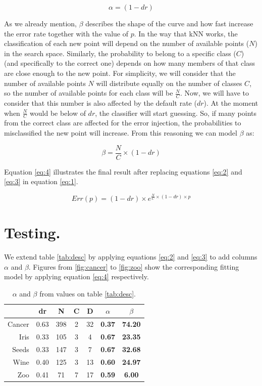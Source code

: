 \documentclass{article}
\begin{document}
\begin{equation}\label{eq:2}
  \alpha = (1-dr)
\end{equation}

As we already mention, $\beta$ describes the shape of the curve and how fast increase the error rate together with the value of $p$. In the way that kNN works, the classification of each new point will depend on the number of available points ($N$) in the search space.  Similarly, the probability to belong to a specific class ($C$) (and specifically to the correct one) depends on how many members of that class are close enough to the new point. For simplicity, we will consider that the number of available points $N$ will distribute equally on the number of classes $C$, so the number of available points for each class will be $\frac{N}{C}$.  Now, we will have to consider that this number is also affected by the default rate ($dr$).  At the moment when $\frac{N}{C}$ would be below of $dr$, the classifier will start guessing. So, if many points from the correct class are affected for the error injection, the probabilities to misclassified the new point will increase.  From this reasoning we can model $\beta$ as: 

\begin{equation}\label{eq:3}
  \beta = \frac{N}{C} \times (1-dr)
\end{equation}

Equation \ref{eq:4} illustrates the final result after replacing equations \ref{eq:2} and \ref{eq:3} in equation \ref{eq:1}.

\begin{equation}\label{eq:4}
  Err(p)=(1-dr) \times e^{\frac{N}{C} \times (1-dr) \times p}
\end{equation}


\section{Testing.}

We extend table \ref{tab:desc} by applying equations \ref{eq:2} and \ref{eq:3} to add columns $\alpha$ and $\beta$.  Figures from \ref{fig:cancer} to \ref{fig:zoo} show the corresponding fitting model by applying equation \ref{eq:4} respectively.

\begin{table}[h]
 \centering
 \begin{tabular}{rcccccc}
  \toprule
  & dr	& N	& C	& D 	& \boldmath$\alpha$	& \boldmath$\beta$	\\
  \midrule
  Cancer& 0.63	& 398	& 2	& 32 	& \textbf{0.37}	& \textbf{74.20}	\\
  Iris	& 0.33	& 105	& 3	& 4 	& \textbf{0.67}	& \textbf{23.35}	\\
  Seeds	& 0.33	& 147	& 3	& 7 	& \textbf{0.67}	& \textbf{32.68}	\\
  Wine	& 0.40	& 125	& 3	& 13 	& \textbf{0.60}	& \textbf{24.97}	\\
  Zoo	& 0.41	& 71	& 7	& 17 	& \textbf{0.59}	& \textbf{6.00}		\\
  \bottomrule
 \end{tabular}
 \caption{$\alpha$ and $\beta$ from values on table \ref{tab:desc}.}\label{tab:extend}
\end{table}
\end{document}
